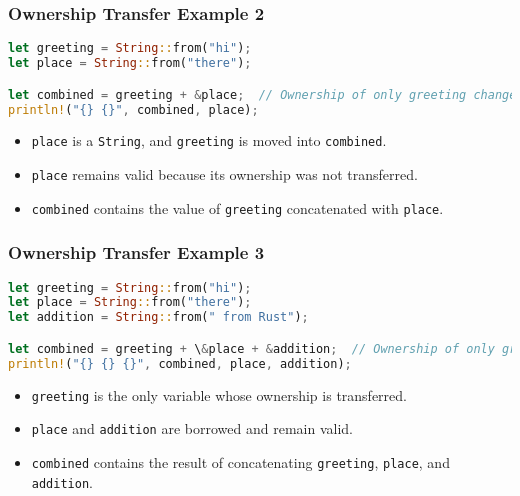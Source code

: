 \documentclass[aspectratio=169, table]{beamer}
\begin{document}
\begin{frame}[fragile]
\frametitle{Ownership Transfer Example 2}
\begin{lstlisting}[language=Rust]
let greeting = String::from("hi"); 
let place = String::from("there");

let combined = greeting + &place;  // Ownership of only greeting changed
println!("{} {}", combined, place); 
\end{lstlisting}
\begin{itemize}
\item \texttt{place} is a \texttt{String}, and \texttt{greeting} is moved into \texttt{combined}.
\item \texttt{place} remains valid because its ownership was not transferred.
\item \texttt{combined} contains the value of \texttt{greeting} concatenated with \texttt{place}.
\end{itemize}
\end{frame}

\begin{frame}[fragile]
\frametitle{Ownership Transfer Example 3}
\begin{lstlisting}[language=Rust]
let greeting = String::from("hi"); 
let place = String::from("there");
let addition = String::from(" from Rust");

let combined = greeting + \&place + &addition;  // Ownership of only greeting changed
println!("{} {} {}", combined, place, addition); 
\end{lstlisting}
\begin{itemize}
\item \texttt{greeting} is the only variable whose ownership is transferred.
\item \texttt{place} and \texttt{addition} are borrowed and remain valid.
\item \texttt{combined} contains the result of concatenating \texttt{greeting}, \texttt{place}, and \texttt{addition}.
\end{itemize}
\end{frame}
\end{document}
